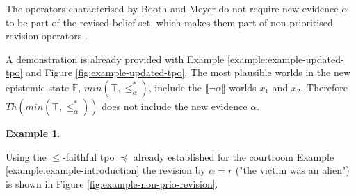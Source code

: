\documentclass[english, 12pt]{scrartcl}
\theoremstyle{definition}
\newtheorem{example}{Example}
\theoremstyle{definition}
\theoremstyle{definition}
\newcommand{\modelsOf}[1]{\llbracket #1 \rrbracket}
\begin{document}
The operators characterised by Booth and Meyer do not require new evidence $\alpha$ to be part of the revised belief set, which makes them part of non-prioritised revision operators \cite{Hansson1999}.

A demonstration is already provided with Example \ref{example:example-updated-tpo} and Figure \ref{fig:example-updated-tpo}. The most plausible worlds in the new epistemic state $\mathbb{E}$, $min(\top, \leq_{\alpha}^{\ast})$, include the $\modelsOf{\neg\alpha}$-worlds $x_{1}$ and $x_{2}$. Therefore $Th(min(\top, \leq_{\alpha}^{\ast}))$ does not include the new evidence $\alpha$.

\begin{example}
    \label{example:example-non-prio-revision} 
    
    Using the $\leq$-faithful tpo $\preceq$ already established for the courtroom Example \ref{example:example-introduction} the revision by $\alpha = r$ ("the victim was an alien") is shown in Figure \ref{fig:example-non-prio-revision}.
    \begin{figure}[H]
            \centering
\end{figure}
\end{example}
\end{document}
